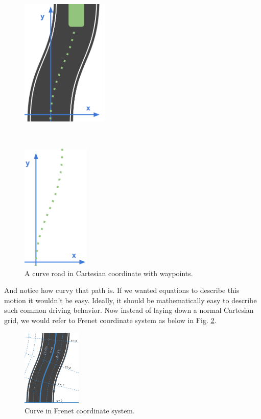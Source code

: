 \begin{figure}[h]
  \centering
    \begin{minipage}{.5\textwidth}
        \centering
        \includegraphics[height=2.4in]{figs/ch3/curve-in-cartesian-with-waypoints}
    \end{minipage}
    ~
    \begin{minipage}{.5\textwidth}
       \centering
      \includegraphics[height=2.4in]{figs/ch3/waypoints-in-cartesian}
     \end{minipage}
\caption{A curve road in Cartesian coordinate with waypoints.}
\label{fig:curve-in-cartesian-wp}
\end{figure}

And notice how curvy that path is. If we wanted equations to describe this motion it wouldn't be easy. Ideally, it should be mathematically easy to describe such common driving behavior. Now instead of laying down a normal Cartesian grid, we would refer to Frenet coordinate system as below in Fig. \ref{fig:curve-in-frenet}.

\begin{figure}[h]
\centering
\includegraphics[width=0.25\textwidth]{figs/ch3/curve-in-frenet}
\caption{Curve in Frenet coordinate system.}
\label{fig:curve-in-frenet}
\end{figure}

